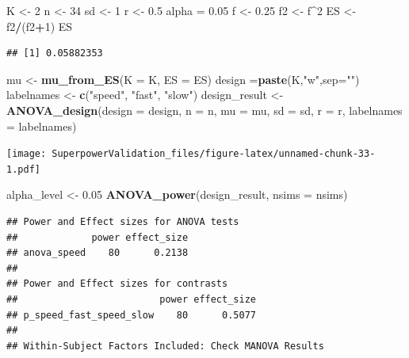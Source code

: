 \documentclass[]{book}
\newenvironment{Shaded}{\begin{snugshade}}{\end{snugshade}}
\newcommand{\DataTypeTok}[1]{\textcolor[rgb]{0.13,0.29,0.53}{#1}}
\newcommand{\DecValTok}[1]{\textcolor[rgb]{0.00,0.00,0.81}{#1}}
\newcommand{\FloatTok}[1]{\textcolor[rgb]{0.00,0.00,0.81}{#1}}
\newcommand{\KeywordTok}[1]{\textcolor[rgb]{0.13,0.29,0.53}{\textbf{#1}}}
\newcommand{\NormalTok}[1]{#1}
\newcommand{\OperatorTok}[1]{\textcolor[rgb]{0.81,0.36,0.00}{\textbf{#1}}}
\newcommand{\StringTok}[1]{\textcolor[rgb]{0.31,0.60,0.02}{#1}}
\begin{document}
\begin{Shaded}
\begin{Highlighting}[]
\NormalTok{K <-}\StringTok{ }\DecValTok{2}
\NormalTok{n <-}\StringTok{ }\DecValTok{34}
\NormalTok{sd <-}\StringTok{ }\DecValTok{1}
\NormalTok{r <-}\StringTok{ }\FloatTok{0.5}
\NormalTok{alpha =}\StringTok{ }\FloatTok{0.05}
\NormalTok{f <-}\StringTok{ }\FloatTok{0.25}
\NormalTok{f2 <-}\StringTok{ }\NormalTok{f}\OperatorTok{^}\DecValTok{2}
\NormalTok{ES <-}\StringTok{ }\NormalTok{f2}\OperatorTok{/}\NormalTok{(f2}\OperatorTok{+}\DecValTok{1}\NormalTok{)}
\NormalTok{ES}
\end{Highlighting}
\end{Shaded}

\begin{verbatim}
## [1] 0.05882353
\end{verbatim}

\begin{Shaded}
\begin{Highlighting}[]
\NormalTok{mu <-}\StringTok{ }\KeywordTok{mu_from_ES}\NormalTok{(}\DataTypeTok{K =}\NormalTok{ K, }\DataTypeTok{ES =}\NormalTok{ ES)}
\NormalTok{design =}\KeywordTok{paste}\NormalTok{(K,}\StringTok{"w"}\NormalTok{,}\DataTypeTok{sep=}\StringTok{""}\NormalTok{)}
\NormalTok{labelnames <-}\StringTok{ }\KeywordTok{c}\NormalTok{(}\StringTok{"speed"}\NormalTok{, }\StringTok{"fast"}\NormalTok{, }\StringTok{"slow"}\NormalTok{)}
\NormalTok{design_result <-}\StringTok{ }\KeywordTok{ANOVA_design}\NormalTok{(}\DataTypeTok{design =}\NormalTok{ design,}
                   \DataTypeTok{n =}\NormalTok{ n, }
                   \DataTypeTok{mu =}\NormalTok{ mu, }
                   \DataTypeTok{sd =}\NormalTok{ sd, }
                   \DataTypeTok{r =}\NormalTok{ r, }
                   \DataTypeTok{labelnames =}\NormalTok{ labelnames)}
\end{Highlighting}
\end{Shaded}

\texttt{[image: SuperpowerValidation\_files/figure-latex/unnamed-chunk-33-1.pdf]}

\begin{Shaded}
\begin{Highlighting}[]
\NormalTok{alpha_level <-}\StringTok{ }\FloatTok{0.05}
\KeywordTok{ANOVA_power}\NormalTok{(design_result, }\DataTypeTok{nsims =}\NormalTok{ nsims)}
\end{Highlighting}
\end{Shaded}

\begin{verbatim}
## Power and Effect sizes for ANOVA tests
##             power effect_size
## anova_speed    80      0.2138
## 
## Power and Effect sizes for contrasts
##                         power effect_size
## p_speed_fast_speed_slow    80      0.5077
## 
## Within-Subject Factors Included: Check MANOVA Results
\end{verbatim}
\end{document}
